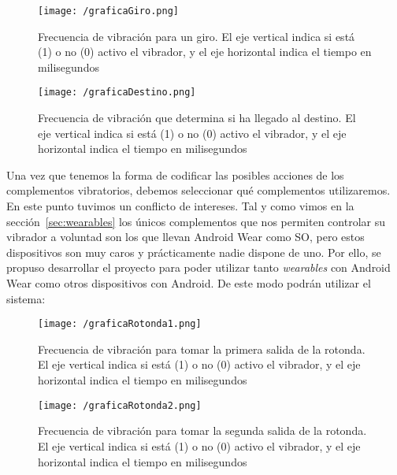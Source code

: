\begin{figure}[!h]
  \begin{center}
    \texttt{[image: /graficaGiro.png]}
    \caption{Frecuencia de vibración para un giro. El eje vertical indica si está (1) o no (0)
      activo el vibrador, y el eje horizontal indica el tiempo en milisegundos}
    \label{fig:graficaGiro}
  \end{center}
\end{figure}

\begin{figure}[!h]
  \begin{center}
    \texttt{[image: /graficaDestino.png]}
    \caption{Frecuencia de vibración que determina si ha llegado al destino. El eje vertical indica
      si está (1) o no (0) activo el vibrador, y el eje horizontal indica el tiempo en milisegundos}
    \label{fig:graficaDestino}
  \end{center}
\end{figure}

Una vez que tenemos la forma de codificar las posibles acciones de los complementos vibratorios,
debemos seleccionar qué complementos utilizaremos. En este punto tuvimos un conflicto de
intereses. Tal y como vimos en la sección~\ref{sec:wearables} los únicos complementos que nos
permiten controlar su vibrador a voluntad son los que llevan Android Wear como \acs{SO}, pero estos
dispositivos son muy caros y prácticamente nadie dispone de uno. Por ello, se propuso desarrollar el
proyecto para poder utilizar tanto \emph{wearables} con Android Wear como otros dispositivos con
Android. De este modo podrán utilizar el sistema:

\newpage
\begin{figure}[!h]
  \begin{center}
    \texttt{[image: /graficaRotonda1.png]}
    \caption{Frecuencia de vibración para tomar la primera salida de la rotonda. El eje vertical
      indica si está (1) o no (0) activo el vibrador, y el eje horizontal indica el tiempo en
      milisegundos}
    \label{fig:graficaRotonda1}
  \end{center}
\end{figure}

\begin{figure}[!h]
  \begin{center}
    \texttt{[image: /graficaRotonda2.png]}
    \caption{Frecuencia de vibración para tomar la segunda salida de la rotonda. El eje vertical
      indica si está (1) o no (0) activo el vibrador, y el eje horizontal indica el tiempo en
      milisegundos}
    \label{fig:graficaRotonda2}
  \end{center}
\end{figure}

